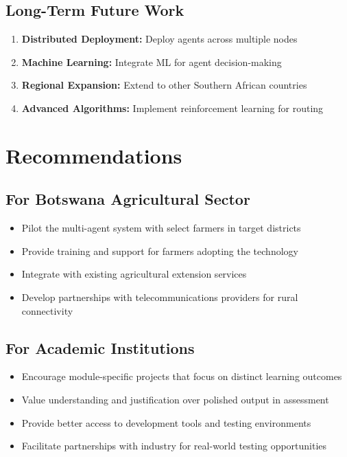 \subsection{Long-Term Future Work}

\begin{enumerate}
    \item \textbf{Distributed Deployment:} Deploy agents across multiple nodes
    \item \textbf{Machine Learning:} Integrate ML for agent decision-making
    \item \textbf{Regional Expansion:} Extend to other Southern African countries
    \item \textbf{Advanced Algorithms:} Implement reinforcement learning for routing
\end{enumerate}

\section{Recommendations}

\subsection{For Botswana Agricultural Sector}

\begin{itemize}
    \item Pilot the multi-agent system with select farmers in target districts
    \item Provide training and support for farmers adopting the technology
    \item Integrate with existing agricultural extension services
    \item Develop partnerships with telecommunications providers for rural connectivity
\end{itemize}

\subsection{For Academic Institutions}

\begin{itemize}
    \item Encourage module-specific projects that focus on distinct learning outcomes
    \item Value understanding and justification over polished output in assessment
    \item Provide better access to development tools and testing environments
    \item Facilitate partnerships with industry for real-world testing opportunities
\end{itemize}

